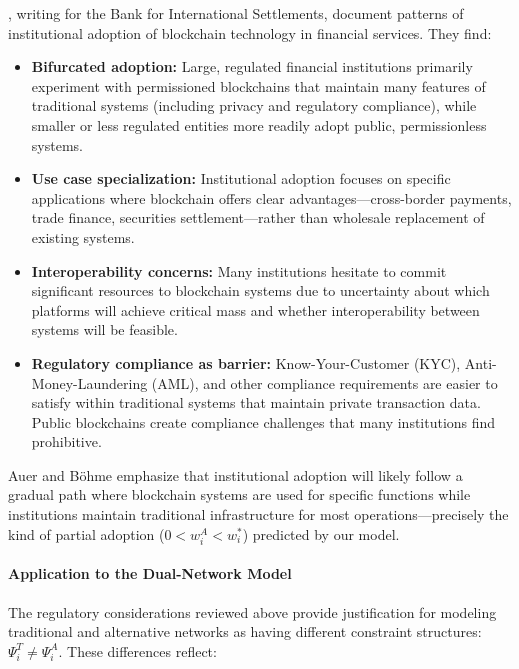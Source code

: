 , writing for the Bank for International Settlements, document patterns of institutional adoption of blockchain technology in financial services. They find:

\begin{itemize}
    \item \textbf{Bifurcated adoption:} Large, regulated financial institutions primarily experiment with permissioned blockchains that maintain many features of traditional systems (including privacy and regulatory compliance), while smaller or less regulated entities more readily adopt public, permissionless systems.
    
    \item \textbf{Use case specialization:} Institutional adoption focuses on specific applications where blockchain offers clear advantages—cross-border payments, trade finance, securities settlement—rather than wholesale replacement of existing systems.
    
    \item \textbf{Interoperability concerns:} Many institutions hesitate to commit significant resources to blockchain systems due to uncertainty about which platforms will achieve critical mass and whether interoperability between systems will be feasible.
    
    \item \textbf{Regulatory compliance as barrier:} Know-Your-Customer (KYC), Anti-Money-Laundering (AML), and other compliance requirements are easier to satisfy within traditional systems that maintain private transaction data. Public blockchains create compliance challenges that many institutions find prohibitive.
\end{itemize}

Auer and Böhme emphasize that institutional adoption will likely follow a gradual path where blockchain systems are used for specific functions while institutions maintain traditional infrastructure for most operations—precisely the kind of partial adoption ($0 < w_i^A < w_i^*$) predicted by our model.

\paragraph{Application to the Dual-Network Model}

The regulatory considerations reviewed above provide justification for modeling traditional and alternative networks as having different constraint structures: $\Psi_i^T \neq \Psi_i^A$. These differences reflect:

